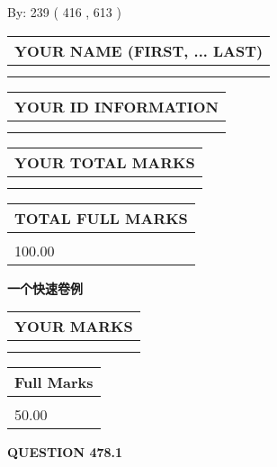 \documentclass{ctexart}
\begin{document}
   
\hspace{1.0in} By: 
 239 ( 416 ,  613 )
   
   
   
   
\newpage 
\setcounter{page}{ 
   478001 } 
   
   
   
   
\noindent\begin{tabular}{|l|}
\hline
YOUR NAME (FIRST, ... LAST)  \\
\hline
 \\ 
 \\ 
\hline
\end{tabular}
\hspace{0.05in} \begin{tabular}{|l|}
\hline
 YOUR   ID   INFORMATION  \\
\hline
 \\ 
 \\ 
\hline
\end{tabular}
   
   
\vspace{0.2in}\noindent\begin{tabular}{|l|}
\hline
YOUR TOTAL MARKS  \\
\hline
 \\ 
 \\ 
\hline
\end{tabular}
\hspace{0.05in} \begin{tabular}{|l|}
\hline
TOTAL FULL MARKS  \\
\hline
 \\ 
100.00 \\
\hline
\end{tabular}
   
   
 \vspace{0.2in}
{\LARGE {\textbf{ 一个快速卷例}}}
   
   
  
\vspace{0.2in}
  
\noindent\begin{tabular}{|l|}
\hline
 YOUR MARKS  \\
\hline
 \\ 
 \\ 
\hline
\end{tabular}
\hspace{0.05in} \begin{tabular}{|l|}
\hline
 Full Marks  \\
\hline
 \\ 
50.00 \\
\hline
\end{tabular}
{\textbf{\Large{QUESTION
478.1 
}}}
  
\end{document}
